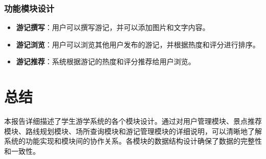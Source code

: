 \documentclass{ctexart}
\begin{document}
\subsubsection{功能模块设计}
\begin{itemize}
    \item \textbf{游记撰写}：用户可以撰写游记，并可以添加图片和文字内容。
    \item \textbf{游记浏览}：用户可以浏览其他用户发布的游记，并根据热度和评分进行排序。
    \item \textbf{游记推荐}：系统根据游记的热度和评分推荐给用户浏览。
\end{itemize}

\section{总结}
本报告详细描述了学生游学系统的各个模块设计。通过对用户管理模块、景点推荐模块、路线规划模块、场所查询模块和游记管理模块的详细说明，可以清晰地了解系统的功能实现和模块间的协作关系。各模块的数据结构设计确保了数据的完整性和一致性。
\end{document}

